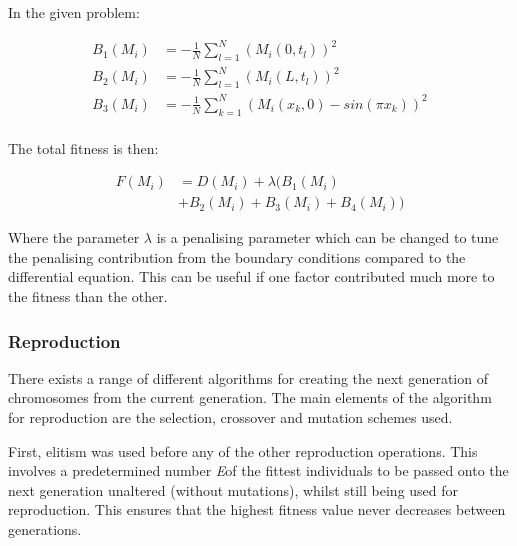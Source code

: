 \documentclass[multicolumn, 12pt]{extarticle}
\begin{document}
In the given problem: 

\begin{align*}
    B_1(M_{i}) & = -\frac{1}{N} \sum_{l=1}^{N} \left( M_i(0, t_l)\right) ^2  \\
    B_2(M_{i}) & = -\frac{1}{N} \sum_{l=1}^{N} (M_i(L, t_l))^2  \\
    B_3(M_{i}) & = -\frac{1}{N} \sum_{k=1}^{N} (M_i(x_k, 0) - sin(\pi x_{k}))^2  \\
\end{align*}


The total fitness is then: 

\begin{align*}
    F(M_{i}) &= D(M_{i}) + \lambda  ( B_1(M_{i})  \\
    		&+  B_2(M_{i})  +  B_3(M_{i})  + B_4(M_{i})  )
\end{align*}

Where the parameter $\lambda$ is a penalising parameter which can be changed to tune the penalising contribution from the boundary conditions compared to the differential equation. This can be useful if one factor contributed much more to the fitness than the other. 

\subsubsection{Reproduction}
There exists a range of different algorithms for creating the next generation of chromosomes from the current generation. The main elements  of the algorithm for reproduction are the selection, crossover and mutation schemes used. 

First, elitism was used before any of the other reproduction operations. This involves a predetermined number  \textit{E}of the fittest individuals to be passed onto the next generation unaltered (without mutations), whilst still being used for reproduction. This ensures that the highest fitness value never decreases between generations. 
\end{document}
